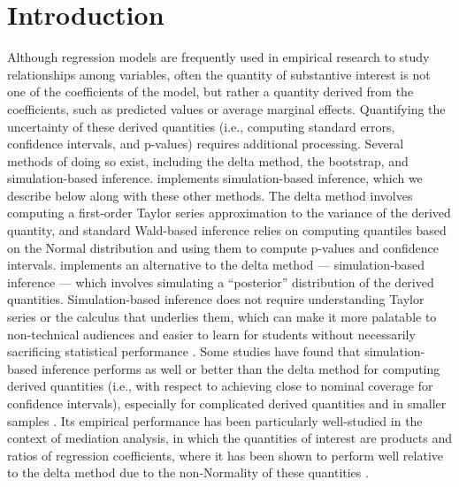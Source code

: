 \section{Introduction}\label{introduction}
Although regression models are frequently used in empirical research to study relationships among variables, often the quantity of substantive interest is not one of the coefficients of the model, but rather a quantity derived from the coefficients, such as predicted values or average marginal effects. Quantifying the uncertainty of these derived quantities (i.e., computing standard errors, confidence intervals, and p-values) requires additional processing. Several methods of doing so exist, including the delta method, the bootstrap, and simulation-based inference.  implements simulation-based inference, which we describe below along with these other methods.
The delta method involves computing a first-order Taylor series approximation to the variance of the derived quantity, and standard Wald-based inference relies on computing quantiles based on the Normal distribution and using them to compute p-values and confidence intervals.  implements an alternative to the delta method --- simulation-based inference --- which involves simulating a ``posterior'' distribution of the derived quantities. Simulation-based inference does not require understanding Taylor series or the calculus that underlies them, which can make it more palatable to non-technical audiences and easier to learn for students without necessarily sacrificing statistical performance \citep{kingMakingMostStatistical2000, zelnerUsingSimulationInterpret2009}. Some studies have found that simulation-based inference performs as well or better than the delta method for computing derived quantities (i.e., with respect to achieving close to nominal coverage for confidence intervals), especially for complicated derived quantities and in smaller samples \citep{mackinnonConfidenceLimitsIndirect2004, holeComparisonApproachesEstimating2007, herronPostestimationUncertaintyLimited1999}. Its empirical performance has been particularly well-studied in the context of mediation analysis, in which the quantities of interest are products and ratios of regression coefficients, where it has been shown to perform well relative to the delta method due to the non-Normality of these quantities \citep{tofighiMonteCarloConfidence2016, preacherAdvantagesMonteCarlo2012}.
